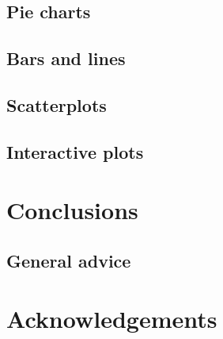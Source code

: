 \subsection{Pie charts}

\subsection{Bars and lines}

\subsection{Scatterplots}

\subsection{Interactive plots}


\section{Conclusions}
\subsection{General advice}


\section{Acknowledgements}
%



